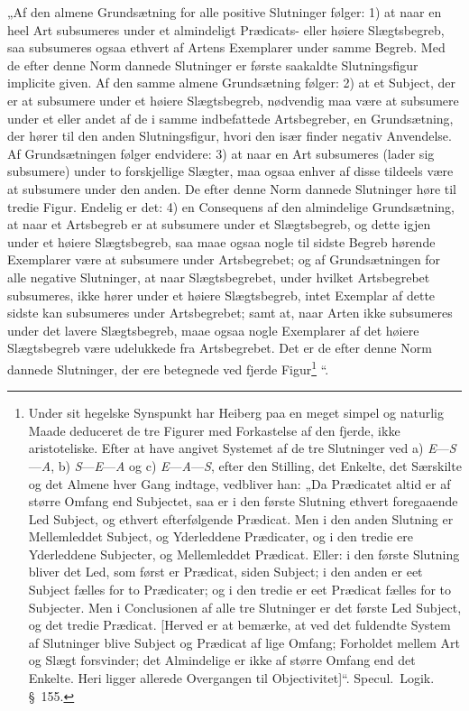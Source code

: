 \documentclass[12pt]{book}
\newcommand{\opage}[1]{\marginnote{\footnotesize\textit{[#1]}}}
\begin{document}
„Af den almene Grundsætning for alle positive Slutninger følger: 1) at naar en heel Art subsumeres under et almindeligt Prædicats- eller høiere Slægtsbegreb, saa subsumeres ogsaa ethvert af Artens Exemplarer under samme Begreb. Med de efter denne Norm dannede Slutninger er første saakaldte Slutningsfigur implicite given. Af den samme almene Grundsætning følger: 2) at et Subject, der er at subsumere under et høiere Slægtsbegreb, nødvendig maa være at subsumere under et eller andet af de i samme indbefattede Artsbegreber, en Grundsætning, der hører til den anden Slutningsfigur, hvori den især finder negativ Anvendelse. Af Grundsætningen følger endvidere: 3) at naar en Art subsumeres (lader sig subsumere) under to forskjellige Slægter, maa ogsaa enhver af disse tildeels være at subsumere under den anden. De efter denne Norm dannede Slutninger høre til tredie Figur. Endelig er det: 4) en Consequens af den almindelige Grundsætning, at naar et Artsbegreb er at subsumere under et Slægtsbegreb, og dette igjen under et høiere Slægtsbegreb, saa maae ogsaa nogle til sidste Begreb hørende Exemplarer være at subsumere under Artsbegrebet; og af Grundsætningen for alle negative Slutninger, at naar Slægtsbegrebet, under hvilket Artsbegrebet subsumeres, ikke hører under et høiere Slægtsbegreb, intet Exemplar af dette sidste kan subsumeres under Artsbegrebet; samt at, naar Arten ikke subsumeres under det lavere Slægtsbegreb, maae ogsaa nogle Exemplarer af det høiere Slægtsbegreb være udelukkede fra
\opage{321}Artsbegrebet. Det er de efter denne Norm dannede Slutninger, der ere betegnede ved fjerde Figur\footnote{Under sit hegelske Synspunkt har Heiberg paa en meget simpel og naturlig Maade deduceret de tre Figurer med Forkastelse af den fjerde, ikke aristoteliske. Efter at have angivet Systemet af de tre Slutninger ved a) \textit{E}---\textit{S}---\textit{A}, b) \textit{S}---\textit{E}---\textit{A} og c) \textit{E}---\textit{A}---\textit{S}, efter den Stilling, det Enkelte, det Særskilte og det Almene hver Gang indtage, vedbliver han: „Da Prædicatet altid er af større Omfang end Subjectet, saa er i den første Slutning ethvert foregaaende Led Subject, og ethvert efterfølgende Prædicat. Men i den anden Slutning er Mellemleddet Subject, og Yderleddene Prædicater, og i den tredie ere Yderleddene Subjecter, og Mellemleddet Prædicat. Eller: i den første Slutning bliver det Led, som først er Prædicat, siden Subject; i den anden er eet Subject fælles for to Prædicater; og i den tredie er eet Prædicat fælles for to Subjecter. Men i Conclusionen af alle tre Slutninger er det første Led Subject, og det tredie Prædicat. [Herved er at bemærke, at ved det fuldendte System af Slutninger blive Subject og Prædicat af lige Omfang; Forholdet mellem Art og Slægt forsvinder; det Almindelige er ikke af større Omfang end det Enkelte. Heri ligger allerede Overgangen til Objectivitet]“. Specul.\ Logik. §~155.}%
“.
\end{document}
